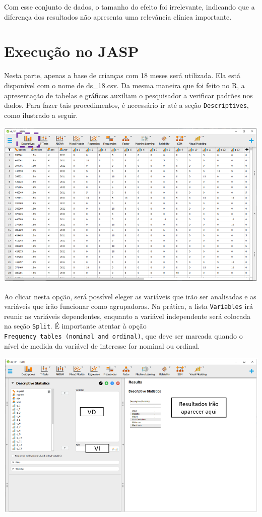 \documentclass[
]{book}
\begin{document}
Com esse conjunto de dados, o tamanho do efeito foi irrelevante, indicando que a diferença dos resultados não apresenta uma relevância clínica importante.

\hypertarget{execuuxe7uxe3o-no-jasp-3}{%
\section{Execução no JASP}\label{execuuxe7uxe3o-no-jasp-3}}

Nesta parte, apenas a base de crianças com 18 meses será utilizada. Ela está disponível com o nome de ds\_18.csv. Da mesma maneira que foi feito no R, a apresentação de tabelas e gráficos auxiliam o pesquisador a verificar padrões nos dados. Para fazer tais procedimentos, é necessário ir até a seção \texttt{Descriptives}, como ilustrado a seguir.

\includegraphics{./img/jasp_descriptives.png}

Ao clicar nesta opção, será possível eleger as variáveis que irão ser analisadas e as variáveis que irão funcionar como agrupadoras. Na prática, a lista \texttt{Variables} irá reunir as variáveis dependentes, enquanto a variável independente será colocada na seção \texttt{Split}. É importante atentar à opção \texttt{Frequency\ tables\ (nominal\ and\ ordinal)}, que deve ser marcada quando o nível de medida da variável de interesse for nominal ou ordinal.

\includegraphics{./img/jasp_descriptives2.png}
\end{document}
